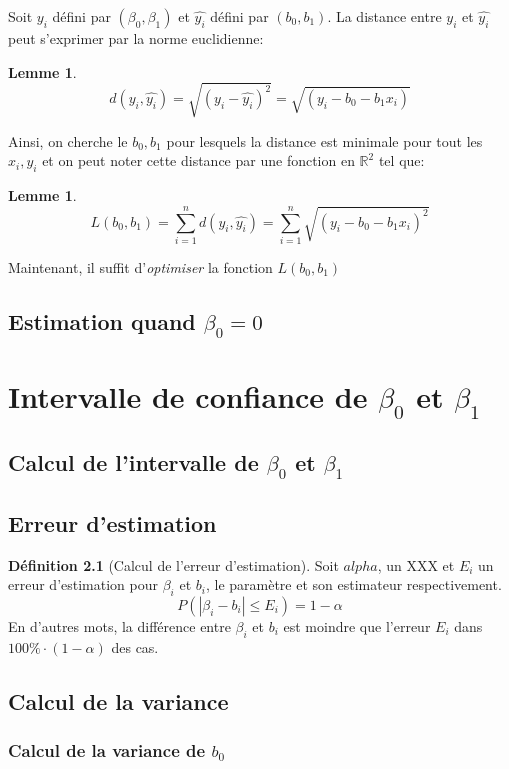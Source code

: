 \documentclass[12pt]{book}
\let\Bbb\mathbb
\newcommand\todo[1]{\phantom{#1}}
\theoremstyle{definition}
\newtheorem{definition}{Définition}[section]
\newtheorem{lemma}[theorem]{Lemme}
\begin{document}
Soit $y_i$ défini par $(\beta_0, \beta_1)$ et $\hat{y_i}$ défini par $(b_0, b_1)$. La distance entre $y_i$ et $\hat{y_i}$ peut s'exprimer
par la norme euclidienne:
\begin{lemma}
    $$ d(y_i, \hat{y_i}) = \sqrt{(y_i - \hat{y_i})^2} = \sqrt{(y_i - b_0 - b_1x_i)} $$
\end{lemma}

Ainsi, on cherche le $b_0, b_1$ pour lesquels la distance est minimale pour tout les $x_i, y_i$ et on peut noter cette distance par une fonction 
en $\Bbb R^2$ tel que:
\begin{lemma}
    $$ L(b_0, b_1) = \sum_{i=1}^{n} d(y_i, \hat{y_i}) = \sum_{i=1}^{n} \sqrt{(y_i - b_0 - b_1x_i)^2} $$
\end{lemma}

Maintenant, il suffit d'\textit{optimiser} la fonction $L(b_0, b_1)$
\section{Estimation quand $\beta_0 = 0$}

\chapter{Intervalle de confiance de $\beta_0$ et $\beta_1$}
\section{Calcul de l'intervalle de $\beta_0$ et $\beta_1$}
\section{Erreur d'estimation}
\begin{definition}[Calcul de l'erreur d'estimation]
    \label{def:calcul_erreur_estimation}
    Soit $alpha$, un XXX \todo{Add name + link} et $E_i$ un erreur d'estimation 
    \todo{Add link} pour $\beta_i$ et $b_i$, le paramètre et son estimateur respectivement.
    $$ P(|\beta_i - b_i| \leq E_i) = 1 - \alpha $$
    En d'autres mots, la différence entre $\beta_i$ et $b_i$ est moindre que l'erreur $E_i$ dans
    $100\% \cdot (1 - \alpha)$ des cas.
\end{definition}
\section{Calcul de la variance}
\subsection{Calcul de la variance de $b_0$}
\end{document}
